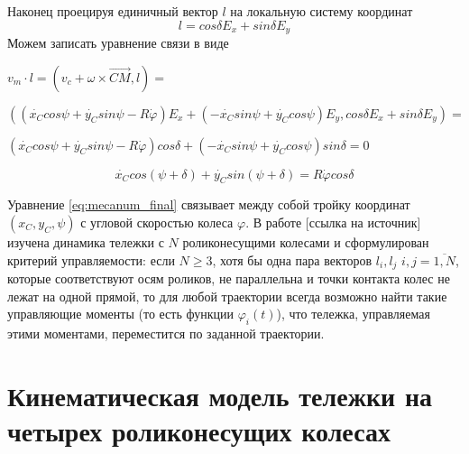 \documentclass[oneside,final,14pt]{extreport}
\begin{document}
\begin{figure}[H]
\end{figure}

 Наконец проецируя единичный вектор $l$ на локальную систему координат 
\begin{equation}
l
=
cos\delta
E_{x}
+
sin\delta
E_{y}
\end{equation}
Можем записать уравнение связи в виде
\begin{flushleft}
$
v_{m}
\cdot
l
=
(
v_{c}
+
\omega
\times
\overrightarrow{CM}
,
l
)
=
$

$
(
(
\dot{x_{C}}
cos\psi
+
\dot{y_{C}}
sin\psi
-R\dot{\varphi}
)
E_{x}
+
(
-\dot{x_{C}}
sin\psi
+
\dot{y_{C}}
cos\psi
)
E_{y}
,
cos\delta
E_{x}
+
sin\delta
E_{y}
)
=
$

$
(
\dot{x_{C}}
cos\psi
+
\dot{y_{C}}
sin\psi
-R\dot{\varphi}
)
cos\delta
+
(
-\dot{x_{C}}
sin\psi
+
\dot{y_{C}}
cos\psi
)
sin\delta
=
0
$
\end{flushleft}
\begin{equation}
\label{eq:mecanum_final}
\dot{x_{C}}
cos(\psi+\delta)
+
\dot{y_{C}}
sin(\psi+\delta)
=
R\dot{\varphi}
cos\delta
\end{equation}

Уравнение \ref{eq:mecanum_final} связывает между собой тройку координат $(x_{C},y_{C},\psi)$ с угловой скоростью колеса $\varphi$. В работе [ссылка на источник] изучена динамика тележки с $N$ роликонесущими колесами и сформулирован критерий управляемости:
если $N \geq 3$, хотя бы одна пара векторов  $l_{i}, l_{j}$ $i,j=\overline{1,N}$, которые соответствуют осям роликов, не параллельна и точки контакта колес не лежат на одной прямой, то для любой траектории всегда возможно найти такие управляющие моменты (то есть функции $\varphi_{i}(t)$), что тележка, управляемая этими моментами, переместится по заданной траектории.

\chapter{Кинематическая модель тележки на четырех роликонесущих колесах}
\end{document}

